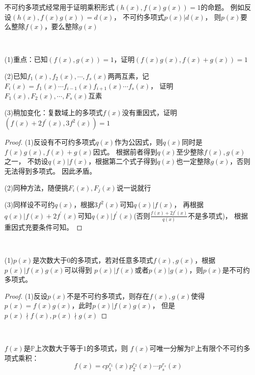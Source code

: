 \begin{note}
  不可约多项式经常用于证明乘积形式$(h(x),f(x)g(x)) = 1$的命题。
  例如反设$(h(x), f(x)g(x)) = d(x)$，
  不可约多项式$p(x) | d(x)$，
  则$p(x)$要么整除$f(x)$，要么整除$g(x)$
\end{note}

~

\begin{exercise}
  (1)重点：已知$(f(x),g(x)) = 1$，证明$(f(x)g(x), f(x) + g(x)) = 1$

  (2)已知$f_1(x),f_2(x),\cdots,f_s(x)$两两互素，记$F_i(x) = f_1(x) \cdots f_{i-1}(x)f_{i+1}(x) \cdots f_s(x)$，
  证明$F_1(x),F_2(x),\cdots,F_s(x)$互素

  (3)稍加变化：复数域上的多项式$f(x)$没有重因式，证明$(f(x) + 2f^{\prime}(x), 3f^2(x)) = 1$
\end{exercise}

\begin{proof}
  (1)反设有不可约多项式$q(x)$作为公因式，则$q(x)$同时是$f(x)g(x), f(x) + g(x)$因式。
  根据前者得到$q(x)$至少整除$f(x),g(x)$之一，
  不妨设$q(x) \big| f(x)$，根据第二个式子得到$q(x)$也一定整除$g(x)$，否则无法得到多项式。
  因此矛盾。

  (2)同种方法，随便挑$F_i(x),F_j(x)$说一说就行

  (3)同样设不可约$q(x)$，根据$3f^2(x)$可知$q(x) \big| f(x)$，
  再根据$q(x) \big| f(x) + 2f^{\prime}(x)$可知$q(x) \big| f^{\prime}(x)$(否则$\frac{f(x)+2f^{\prime}(x)}{q(x)}$不是多项式)，
  根据重因式充要条件可知。
\end{proof}

~

\begin{exercise}[证明不可约多项式]
  (1)$p(x)$是次数大于$0$的多项式，若对任意多项式$f(x),g(x)$，根据$p(x) \big| f(x)g(x)$可以得到
  $p(x) \big| f(x)$或者$p(x) \big| g(x)$，则$p(x)$是不可约多项式。
\end{exercise}

\begin{proof}
  (1)反设$p(x)$不是不可约多项式，则存在$f(x),g(x)$使得$p(x) = f(x)g(x)$，此时$p(x) \big| f(x)g(x)$，
  但是$p(x) \nmid f(x), p(x) \nmid g(x)$
\end{proof}

~

\begin{theorem}[因式分解唯一性]
  $f(x)$是$\mathbb{P}$上次数大于等于$1$的多项式，则
  $f(x)$可唯一分解为$\mathbb{P}$上有限个不可约多项式乘积：
  \begin{equation*}
    f(x) = cp_1^{r_1}(x) p_2^{r_2}(x) \cdots p_s^{r_s}(x)
  \end{equation*}
\end{theorem}



